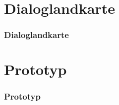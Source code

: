 \section{Dialoglandkarte}
\begin{frame}
\frametitle{Dialoglandkarte}
\end{frame}

\section{Prototyp}
\begin{frame}
\frametitle{Prototyp}
\end{frame}


